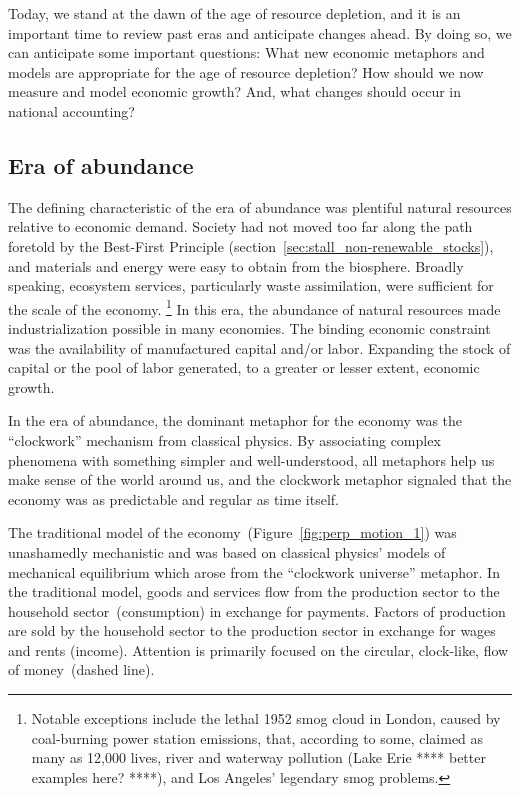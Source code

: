 Today, we stand at the dawn of the age of resource depletion, 
and it is an important time to review past eras
and anticipate changes ahead.
By doing so, we can anticipate some important questions:
What new economic metaphors and models are appropriate for the age of resource depletion?
How should we now measure and model economic growth?
And, what changes should occur in national accounting?


\subsection{Era of abundance}
\label{sec:era_of_abundance}

The defining characteristic of the era of abundance 
was plentiful natural resources relative to economic demand.
Society had not moved too far along the path foretold
by the Best-First Principle (section~\ref{sec:stall_non-renewable_stocks}),
and materials and energy were easy to obtain from the biosphere.
Broadly speaking, ecosystem services,
particularly waste assimilation,
were sufficient for the scale of the economy.%
	\footnote{
	Notable exceptions include
	the lethal 1952 smog cloud in London, 
	caused by coal-burning power station emissions,
	that, according to some, 
	claimed as many as 12,000 lives,
	river and waterway pollution (Lake Erie **** better examples here? ****), 
	and Los Angeles' legendary smog problems.\cite{Davis2002,Bell2004}
	}
In this era, the abundance of natural resources
made industrialization possible in many economies.
The binding economic constraint was the availability of 
manufactured capital and/or labor.
Expanding the stock of capital or the pool of labor generated, 
to a greater or lesser extent, 
economic growth.

In the era of abundance, 
the dominant metaphor for the economy 
was the ``clockwork'' mechanism from classical physics.
By associating complex phenomena with
something simpler and well-understood,
all metaphors help us make sense of the world around us, and
the clockwork metaphor signaled that the economy 
was as predictable and regular as time itself.

The traditional model of the economy~(Figure~\ref{fig:perp_motion_1})
was unashamedly mechanistic
and was based on classical physics' models 
of mechanical equilibrium which arose from the 
``clockwork universe'' metaphor.\cite{Ingrao1990, Walras1892, Walras1993}
In the traditional model,
goods and services flow from the production sector
to the household sector~(consumption)
in exchange for payments.
Factors of production
are sold by the household sector to the
production sector in exchange for wages and rents (income).
Attention is primarily focused on the circular, clock-like, flow
of money~(dashed line).


